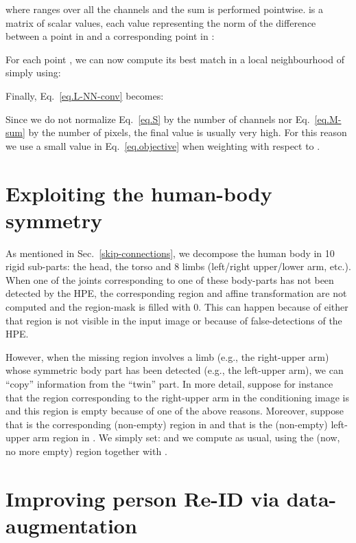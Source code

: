\documentclass[10pt,twocolumn,letterpaper]{article}
\begin{document}
\noindent 
 where  ranges over all the channels and the sum is performed  
pointwise. 
 is a matrix of scalar values, each value representing the  norm of the difference between a point  in  and a corresponding point  in  :




For each point , we can now compute its best match in a local neighbourhood of   simply using:



Finally,
Eq.~\ref{eq.L-NN-conv} becomes:




Since we do not normalize  Eq.~\ref{eq.S} by the number of  channels nor   Eq.~\ref{eq.M-sum} by the number of pixels,
the final value   is usually very high. For this reason we use a small value  in Eq.~\ref{eq.objective} when weighting  with respect to .


\section{Exploiting the human-body symmetry}
\label{symmetry}

As mentioned in Sec.~\ref{skip-connections}, we decompose the human body in 10 rigid sub-parts: the head, the torso and 8 limbs (left/right upper/lower arm, etc.). When one of the joints corresponding to one of these body-parts has not been detected by the HPE, the corresponding region and affine transformation are not computed and  the region-mask is filled with 0. This can happen because of either that region is not visible in the input image or because of false-detections of the HPE. 

However, when the missing region involves a limb (e.g., the right-upper arm) whose symmetric body part has been detected (e.g., the left-upper arm), we can ``copy'' information from the ``twin'' part.
In more detail, suppose for instance that the region corresponding to the right-upper arm in the conditioning image is  and this region is empty because of one of the above reasons. Moreover, suppose that  is the corresponding (non-empty) region in  and that 
is the (non-empty)  left-upper arm region in . We simply set:  and we compute  as usual, using the (now, no more empty) region  together with  .


\section{Improving person Re-ID via data-augmentation}
\label{PersonRe-ID}
\end{document}
